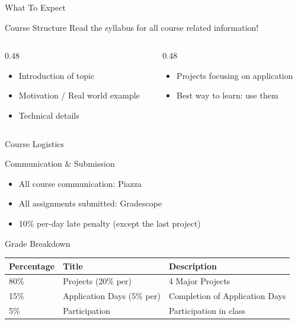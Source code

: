 \documentclass[presentation,aspectratio=1610]{beamer}
\begin{document}
\begin{frame}[label={sec:orgdea6ace}]{What To Expect}
\begin{block}{Course Structure}
\alert{Read the syllabus for all course related information!}
\end{block}
\begin{columns}
\begin{column}{0.48\columnwidth}
\begin{itemize}
\item Introduction of topic
\item Motivation / Real world example
\item Technical details
\end{itemize}
\end{column}
\begin{column}{0.48\columnwidth}
\begin{itemize}
\item Projects focusing on application
\item Best way to learn: \alert{use them}
\end{itemize}
\end{column}
\end{columns}
\end{frame}
\begin{frame}[label={sec:orgcaf83a8}]{Course Logistics}
\begin{alertblock}{Communication \& Submission}
\begin{itemize}
\item All course communication: \alert{Piazza}
\item All assignments submitted: \alert{Gradescope}
\item \alert{10\% per-day late penalty} (except the last project)
\end{itemize}
\end{alertblock}
\begin{block}{Grade Breakdown}
\begin{center}
\begin{tabular}{lll}
Percentage & Title & Description\\
\hline
80\% & Projects (20\% per) & 4 Major Projects\\
15\% & Application Days (5\% per) & Completion of Application Days\\
5\% & Participation & Participation in class\\
\end{tabular}
\end{center}
\end{block}
\end{frame}
\end{document}
